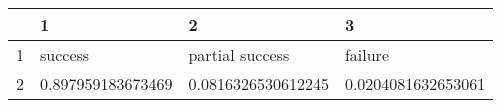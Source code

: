 \begin{table}[ht]
\centering
\begin{tabular}{rlll}
  \hline
 & 1 & 2 & 3 \\ 
  \hline
1 & success & partial success & failure \\ 
  2 & 0.897959183673469 & 0.0816326530612245 & 0.0204081632653061 \\ 
   \hline
\end{tabular}
\end{table}
